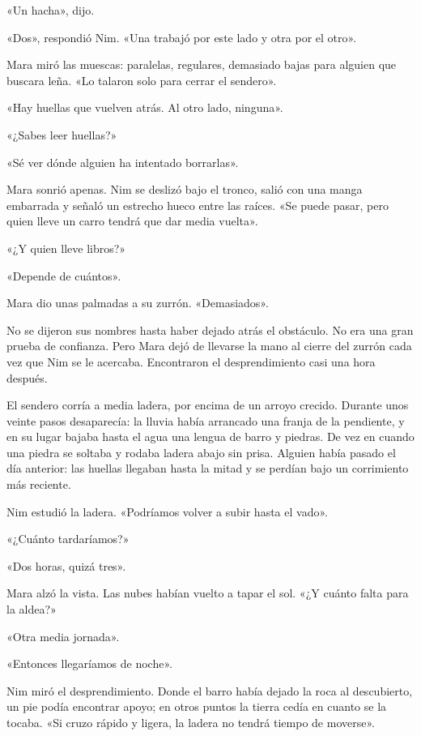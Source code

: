 \documentclass[10pt,a4paper]{article}
\begin{document}
«Un hacha», dijo.

«Dos», respondió Nim. «Una trabajó por este lado y otra por el otro».

Mara miró las muescas: paralelas, regulares, demasiado bajas para alguien que buscara leña. «Lo talaron solo para cerrar el sendero».

«Hay huellas que vuelven atrás. Al otro lado, ninguna».

«¿Sabes leer huellas?»

«Sé ver dónde alguien ha intentado borrarlas».

Mara sonrió apenas. Nim se deslizó bajo el tronco, salió con una manga embarrada y señaló un estrecho hueco entre las raíces. «Se puede pasar, pero quien lleve un carro tendrá que dar media vuelta».

«¿Y quien lleve libros?»

«Depende de cuántos».

Mara dio unas palmadas a su zurrón. «Demasiados».

No se dijeron sus nombres hasta haber dejado atrás el obstáculo. No era una gran prueba de confianza. Pero Mara dejó de llevarse la mano al cierre del zurrón cada vez que Nim se le acercaba.
Encontraron el desprendimiento casi una hora después.

El sendero corría a media ladera, por encima de un arroyo crecido. Durante unos veinte pasos desaparecía: la lluvia había arrancado una franja de la pendiente, y en su lugar bajaba hasta el agua una lengua de barro y piedras. De vez en cuando una piedra se soltaba y rodaba ladera abajo sin prisa. Alguien había pasado el día anterior: las huellas llegaban hasta la mitad y se perdían bajo un corrimiento más reciente.

Nim estudió la ladera. «Podríamos volver a subir hasta el vado».

«¿Cuánto tardaríamos?»

«Dos horas, quizá tres».

Mara alzó la vista. Las nubes habían vuelto a tapar el sol. «¿Y cuánto falta para la aldea?»

«Otra media jornada».

«Entonces llegaríamos de noche».

Nim miró el desprendimiento. Donde el barro había dejado la roca al descubierto, un pie podía encontrar apoyo; en otros puntos la tierra cedía en cuanto se la tocaba. «Si cruzo rápido y ligera, la ladera no tendrá tiempo de moverse».
\end{document}
